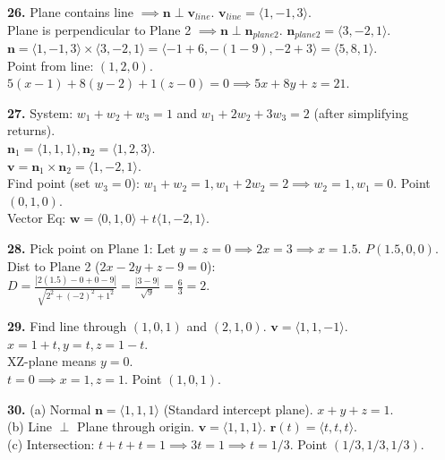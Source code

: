 \documentclass[12pt]{article}
\begin{document}
\textbf{26.} 
Plane contains line $\implies \mathbf{n} \perp \mathbf{v}_{line}$. $\mathbf{v}_{line} = \langle 1, -1, 3 \rangle$. \\
Plane is perpendicular to Plane 2 $\implies \mathbf{n} \perp \mathbf{n}_{plane2}$. $\mathbf{n}_{plane2} = \langle 3, -2, 1 \rangle$. \\
$\mathbf{n} = \langle 1, -1, 3 \rangle \times \langle 3, -2, 1 \rangle = \langle -1+6, -(1-9), -2+3 \rangle = \langle 5, 8, 1 \rangle$. \\
Point from line: $(1, 2, 0)$. \\
$5(x-1) + 8(y-2) + 1(z-0) = 0 \implies 5x + 8y + z = 21$.

\textbf{27.} 
System: $w_1 + w_2 + w_3 = 1$ and $w_1 + 2w_2 + 3w_3 = 2$ (after simplifying returns). \\
$\mathbf{n}_1 = \langle 1, 1, 1 \rangle, \mathbf{n}_2 = \langle 1, 2, 3 \rangle$. \\
$\mathbf{v} = \mathbf{n}_1 \times \mathbf{n}_2 = \langle 1, -2, 1 \rangle$. \\
Find point (set $w_3=0$): $w_1 + w_2 = 1, w_1 + 2w_2 = 2 \implies w_2 = 1, w_1 = 0$. Point $(0, 1, 0)$. \\
Vector Eq: $\mathbf{w} = \langle 0, 1, 0 \rangle + t\langle 1, -2, 1 \rangle$.

\textbf{28.} 
Pick point on Plane 1: Let $y=z=0 \implies 2x=3 \implies x=1.5$. $P(1.5, 0, 0)$. \\
Dist to Plane 2 ($2x - 2y + z - 9 = 0$): \\
$D = \frac{|2(1.5) - 0 + 0 - 9|}{\sqrt{2^2 + (-2)^2 + 1^2}} = \frac{|3-9|}{\sqrt{9}} = \frac{6}{3} = 2$.

\textbf{29.} 
Find line through $(1,0,1)$ and $(2,1,0)$. $\mathbf{v} = \langle 1, 1, -1 \rangle$. \\
$x = 1+t, y = t, z = 1-t$. \\
XZ-plane means $y=0$. \\
$t=0 \implies x=1, z=1$. Point $(1, 0, 1)$.

\textbf{30.} 
(a) Normal $\mathbf{n} = \langle 1, 1, 1 \rangle$ (Standard intercept plane). $x+y+z=1$. \\
(b) Line $\perp$ Plane through origin. $\mathbf{v} = \langle 1, 1, 1 \rangle$. $\mathbf{r}(t) = \langle t, t, t \rangle$. \\
(c) Intersection: $t + t + t = 1 \implies 3t=1 \implies t=1/3$. Point $(1/3, 1/3, 1/3)$.
\end{document}
